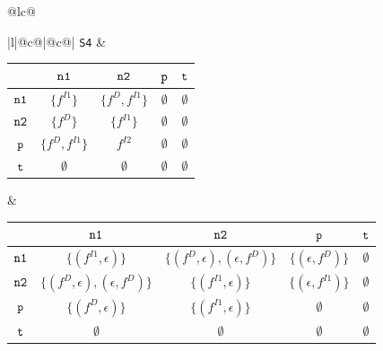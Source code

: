 \documentclass[runningheads,a4paper]{llncs}
\newcommand{\p}{\mbox{\tt p}}
\newcommand{\nO}{\mbox{\tt n1}}
\newcommand{\nT}{\mbox{\tt n2}}
\newcommand{\myt}{\mbox{\tt t}}
\newcommand{\drct}{\ensuremath{D}}
\newcommand{\indrct}{\ensuremath{I}}
\newcommand{\fieldD}[2]{\ensuremath{{#1}_{#2}^\drct}}
\newcommand{\fieldI}[3]{\ensuremath{{#1}_{#2}^{\indrct#3}}}
\begin{document}
\begin{figure}[t]
\begin{tabular}{@{}lc@{}}
{\begin{tabular}[b]{|l|@{}c@{}|@{}c@{}|}
{\tt S4} & 
\begin{tabular}{|c|cccc|} \hline
            & $\nO$  								& $\nT$ 				& $\p$ 			& $\myt$ \\ \hline
  $\nO$ 	& $\{\fieldI{f}{}{1}\}$						& $\{\fieldD{f}{}, \fieldI{f}{}{1}\}$	& $\emptyset$	& $\emptyset$ \\ \hline
  $\nT$ 	& $\{\fieldD{f}{}\}$						& $\{\fieldI{f}{}{1}\}$			& $\emptyset$	& $\emptyset$ \\ \hline
  $\p$ 		& $\{\fieldD{f}{}, \fieldI{f}{}{1}\}$	& $\fieldI{f}{}{2}$		& $\emptyset$	& $\emptyset$ \\ \hline
  $\myt$ 	& $\emptyset$							& $\emptyset$			& $\emptyset$	& $\emptyset$ \\ \hline
\end{tabular}
 &
\begin{tabular}{|c|cccc|} \hline
			& $\nO$  											& $\nT$ 														& $\p$ 			& $\myt$ \\ \hline
  $\nO$ 	& $\{(\fieldI{f}{}{1}, \epsilon)\}$					& $\{(\fieldD{f}{}, \epsilon), (\epsilon, \fieldD{f}{})\}$		& $\{(\epsilon, \fieldD{f}{})\}$	& $\emptyset$ \\ \hline
  $\nT$ 	& $\{(\fieldD{f}{}, \epsilon), (\epsilon, \fieldD{f}{})\}$	& $\{(\fieldI{f}{}{1}, \epsilon)\}$						& $\{(\epsilon, \fieldI{f}{}{1})\}$	& $\emptyset$ \\ \hline
  $\p$ 		& $\{(\fieldD{f}{}, \epsilon)\}$	& $\{(\fieldI{f}{}{1}, \epsilon)\}$	& $\emptyset$	& $\emptyset$ \\ \hline
  $\myt$ 	& $\emptyset$						& $\emptyset$						& $\emptyset$	& $\emptyset$ \\ \hline
\end{tabular} \\ \hline


\end{tabular}}
\end{tabular}
\end{figure}
\end{document}
